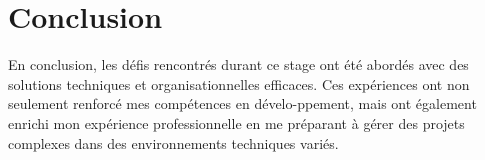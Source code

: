 \newpage
\section*{Conclusion}

En conclusion, les défis rencontrés durant ce stage ont été abordés avec des solutions techniques et organisationnelles efficaces. Ces expériences ont non seulement renforcé mes compétences en dévelo-ppement, mais ont également enrichi mon expérience professionnelle en me préparant à gérer des projets complexes dans des environnements techniques variés.
